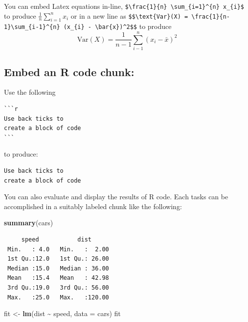 \documentclass[
]{book}
\newenvironment{Shaded}{\begin{snugshade}}{\end{snugshade}}
\newcommand{\AttributeTok}[1]{\textcolor[rgb]{0.13,0.29,0.53}{#1}}
\newcommand{\FunctionTok}[1]{\textcolor[rgb]{0.13,0.29,0.53}{\textbf{#1}}}
\newcommand{\NormalTok}[1]{#1}
\newcommand{\OtherTok}[1]{\textcolor[rgb]{0.56,0.35,0.01}{#1}}
\newcommand{\SpecialCharTok}[1]{\textcolor[rgb]{0.81,0.36,0.00}{\textbf{#1}}}
\begin{document}
You can embed Latex equations in-line, \texttt{\$\textbackslash{}frac\{1\}\{n\}\ \textbackslash{}sum\_\{i=1\}\^{}\{n\}\ x\_\{i\}\$} to produce \(\frac{1}{n} \sum_{i=1}^{n} x_{i}\) or in a new line as \texttt{\$\$\textbackslash{}text\{Var\}(X)\ =\ \textbackslash{}frac\{1\}\{n-1\}\textbackslash{}sum\_\{i-1\}\^{}\{n\}\ (x\_\{i\}\ -\ \textbackslash{}bar\{x\})\^{}2\$\$} to produce \[\text{Var}(X) = \frac{1}{n-1}\sum_{i-1}^{n} (x_{i} - \bar{x})^2\]

\hypertarget{embed-an-r-code-chunk}{%
\subsection{Embed an R code chunk:}\label{embed-an-r-code-chunk}}

Use the following

\begin{verbatim}
```r
Use back ticks to 
create a block of code
```
\end{verbatim}

to produce:

\begin{verbatim}
Use back ticks to 
create a block of code
\end{verbatim}

You can also evaluate and display the results of R code. Each tasks can be accomplished in a suitably labeled chunk like the following:

\begin{Shaded}
\begin{Highlighting}[]
\FunctionTok{summary}\NormalTok{(cars)}
\end{Highlighting}
\end{Shaded}

\begin{verbatim}
     speed           dist       
 Min.   : 4.0   Min.   :  2.00  
 1st Qu.:12.0   1st Qu.: 26.00  
 Median :15.0   Median : 36.00  
 Mean   :15.4   Mean   : 42.98  
 3rd Qu.:19.0   3rd Qu.: 56.00  
 Max.   :25.0   Max.   :120.00  
\end{verbatim}

\begin{Shaded}
\begin{Highlighting}[]
\NormalTok{fit }\OtherTok{\textless{}{-}} \FunctionTok{lm}\NormalTok{(dist }\SpecialCharTok{\textasciitilde{}}\NormalTok{ speed, }\AttributeTok{data =}\NormalTok{ cars)}
\NormalTok{fit}
\end{Highlighting}
\end{Shaded}
\end{document}
